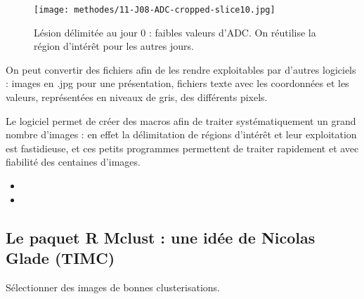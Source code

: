 \begin{description}
\begin{figure}[H]
\begin{center}
\hfill
\texttt{[image: methodes/11-J08-ADC-cropped-slice10.jpg]}%
\end{center}
\caption{L\'esion d\'elimit\'ee au jour 0 : faibles valeurs d'ADC. On r\'eutilise la r\'egion d'int\'er\^et pour les autres jours.}
\label{ex_les}
\end{figure}
%
\item[Exploitation de donn\'ees sous diff\'erents formats] On peut convertir des fichiers afin de les rendre exploitables par d'autres logiciels : %
images en .jpg pour une pr\'esentation, fichiers texte avec les coordonn\'ees et les valeurs, repr\'esent\'ees en niveaux de gris, des diff\'erents pixels.
%
\item[Traitement syst\'ematique avec des macros] Le logiciel permet de cr\'eer des macros afin de traiter syst\'ematiquement un grand nombre d'images : %
en effet la d\'elimitation de r\'egions d'int\'er\^et et leur exploitation est fastidieuse, et ces petits programmes permettent de traiter rapidement et avec fiabilit\'e des centaines d'images.
%
\begin{itemize}
\item
\item 
\end{itemize}
\end{description}










\subsection{Le paquet R Mclust : une id\'ee de Nicolas Glade (TIMC)}%



S\'electionner des images de bonnes clusterisations.

\subsection{}%

